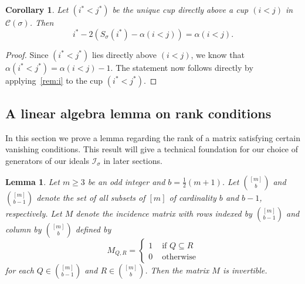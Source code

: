 \documentclass[11pt]{amsart}
\newtheorem{lemma}[theorem]{Lemma}
\newtheorem{corollary}[theorem]{Corollary}
\theoremstyle{remark}
\theoremstyle{remark}
\theoremstyle{definition}
\theoremstyle{definition}
\theoremstyle{definition}
\numberwithin{equation}{section}
\newcommand{\ga}{\alpha}
\newcommand{\gs}{\sigma}
\newcommand{\cc}{\mathcal{C}}
\newcommand{\ci}{\mathcal{I}}
\newcommand{\cupsigma}{\cc(\gs)}
\begin{document}
\begin{corollary}
Let $(i^*<j^*)$ be the unique cup directly above a cup  $(i<j)$ in $\cupsigma$. Then
\[
i^*-2\left(S_\gs(i^*)-\ga(i<j)\right)=\ga(i<j).
\]
\end{corollary}
\begin{proof} Since $(i^*<j^*)$ lies directly above $(i<j)$, we know that $\ga(i^*<j^*)=\ga(i<j)-1$. The statement now follows directly by applying~\eqref{rem:i} to the cup $(i^*<j^*)$.
\end{proof}






\subsection{A linear algebra lemma on rank conditions}
In this section we prove a lemma regarding the rank of a matrix satisfying certain vanishing conditions. This result will give a technical foundation for our choice of generators of our ideals $\ci_\gs$ in later sections. 

\begin{lemma} \label{lem.inv_matrix}
Let $m\geq 3$ be an odd integer and $b = \frac{1}{2}(m+1)$. Let $\binom{[m]}{b}$ and $\binom{[m]}{b-1}$ denote the set of all subsets of $[m]$ of cardinality $b$ and $b-1$, respectively. Let $M$ denote the incidence matrix with rows indexed by $\binom{[m]}{b-1}$ and column by $\binom{[m]}{b}$ defined by
\[
M_{Q,R} = \left\{ \begin{array}{ll} 1 & \text{ if $Q\subseteq R$} \\  0 & \text{ otherwise} \end{array} \right.
\]
for each $Q\in \binom{[m]}{b-1}$ and $R\in \binom{[m]}{b}$. 
Then the matrix $M$ is invertible. 
\end{lemma}
\end{document}
